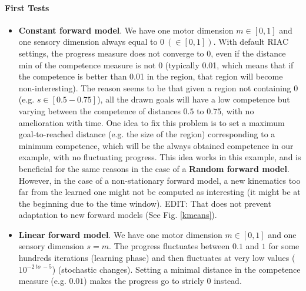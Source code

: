\documentclass[12pt]{article}
\begin{document}
		\paragraph{First Tests}
		\begin{itemize}
	
			\item \textbf{Constant forward model}. We have one motor dimension $m \in [0,1]$ and one sensory dimension always equal to $0~(\in [0,1])$.
				With default RIAC settings, the progress measure does not converge to 0, even if the distance min of the competence measure is not 0 (typically 0.01, which means that if the competence is better than 0.01 in the region, that region will become non-interesting).
				The reason seems to be that given a region not containing $0$ (e.g. $s \in [0.5-0.75]$), all the drawn goals will have a low competence 
				but varying between the competence of distances $0.5$ to $0.75$, with no amelioration with time.
				One idea to fix this problem is to set a maximum goal-to-reached distance (e.g. the size of the region) corresponding to a minimum competence, which will be the always obtained competence in our example, with no fluctuating progress.
				This idea works in this example, and is beneficial for the same reasons in the case of a \textbf{Random forward model}.
				However, in the case of a non-stationary forward model, a new kinematics too far from the learned one might not be computed as interesting (it might be at the beginning due to the time window).
				EDIT: That does not prevent adaptation to new forward models (See Fig. \ref{kmeans}).
				
			\item \textbf{Linear forward model}. We have one motor dimension $m \in [0,1]$ and one sensory dimension  $s = m$.
				The progress fluctuates between $0.1$ and $1$ for some hundreds iterations (learning phase) and then fluctuates at very low values ($10^{-2~to~-5}$)
				(stochastic changes).
				Setting a minimal distance in the competence measure (e.g. $0.01$) makes the progress go to stricly $0$ instead.
			

\end{itemize}
\end{document}
